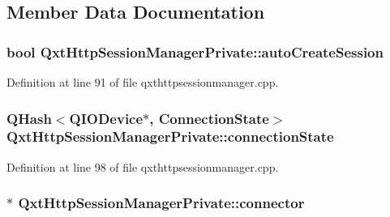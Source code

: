 \subsection{Member Data Documentation}
\hypertarget{class_qxt_http_session_manager_private_aa2c0b26defa494309178f9c0e4cc3765}{
\subsubsection[{auto\-Create\-Session}]{\setlength{\rightskip}{0pt plus 5cm}bool Qxt\-Http\-Session\-Manager\-Private\-::auto\-Create\-Session}}\label{class_qxt_http_session_manager_private_aa2c0b26defa494309178f9c0e4cc3765}


Definition at line 91 of file qxthttpsessionmanager.\-cpp.

\hypertarget{class_qxt_http_session_manager_private_a1793ddf01228a5ec03e28a3bbff8053a}{
\subsubsection[{connection\-State}]{\setlength{\rightskip}{0pt plus 5cm}Q\-Hash$<$Q\-I\-O\-Device$\ast$, {\bf Connection\-State}$>$ Qxt\-Http\-Session\-Manager\-Private\-::connection\-State}}\label{class_qxt_http_session_manager_private_a1793ddf01228a5ec03e28a3bbff8053a}


Definition at line 98 of file qxthttpsessionmanager.\-cpp.

\hypertarget{class_qxt_http_session_manager_private_a4f6a26ca27a73031645ad29d7fb3a500}{
\subsubsection[{connector}]{$\ast$ Qxt\-Http\-Session\-Manager\-Private\-::connector}}\label{class_qxt_http_session_manager_private_a4f6a26ca27a73031645ad29d7fb3a500}



